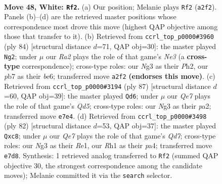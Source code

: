 \documentclass[11pt]{article}
\begin{document}
\clearpage

\begin{figure}[p]\centering
\begin{subfigure}{0.46\textwidth}\centering
\resizebox{\linewidth}{!}{%
\newchessgame
\chessboard[
  setfen={5nk1/1p2Q2p/8/2r4p/8/1q4N1/R5K1/7R w - - 8 48},
  showmover=false,
  pgfstyle=straightmove, color=movearrow, markmove={a2-f2}
]}
\caption{}
\end{subfigure}\hfill
\begin{subfigure}{0.46\textwidth}\centering
\resizebox{\linewidth}{!}{%
\newchessgame
\chessboard[
  setfen={8/4p3/4b1kp/2Q5/1n2q1p1/4N3/7P/5RK1 w - - 3 43},
  showmover=false,
  pgfstyle=straightmove, color=movearrow, markmove={e3-g2}
]}
\caption{}
\end{subfigure}
\\[4pt]
\begin{subfigure}{0.46\textwidth}\centering
\resizebox{\linewidth}{!}{%
\newchessgame
\chessboard[
  setfen={5k2/1p6/5r2/6Q1/3q2P1/3N1P2/P3r1P1/2R4K b - - 16 44},
  showmover=false,
  pgfstyle=straightmove, color=movearrow, markmove={d4-d6}
]}
\caption{}
\end{subfigure}\hfill
\begin{subfigure}{0.46\textwidth}\centering
\resizebox{\linewidth}{!}{%
\newchessgame
\chessboard[
  setfen={2r5/1p1Q3n/2pp2pk/8/p1P5/5q2/8/3RR1K1 w - - 0 42},
  showmover=false,
  pgfstyle=straightmove, color=movearrow, markmove={d7-c8}
]}
\caption{}
\end{subfigure}
\caption{\textbf{Move 48, White: \texttt{Rf2}.} (a) Our position; Melanie plays \texttt{Rf2} (\texttt{a2f2}). Panels (b)--(d) are the retrieved master positions whose correspondence most drove this move (highest QAP objective among those that transfer to it). (b) Retrieved from \texttt{ccrl\_top\_p0000\#3960} (ply 84) [structural distance $d$=71, QAP obj=30]: the master played \texttt{Ng2}; under $\mu$ our \emph{Ra2} plays the role of that game's \emph{Ne3} (a \textbf{cross-type} correspondence); cross-type roles: our \emph{N}g3 as their \emph{P}h2, our \emph{p}b7 as their \emph{b}e6; transferred move \texttt{a2f2} \textbf{(endorses this move)}. (c) Retrieved from \texttt{ccrl\_top\_p0000\#3194} (ply 87) [structural distance $d$=60, QAP obj=39]: the master played \texttt{Qd6}; under $\mu$ our \emph{Qe7} plays the role of that game's \emph{Qd5}; cross-type roles: our \emph{N}g3 as their \emph{p}a2; transferred move \texttt{e7e4}. (d) Retrieved from \texttt{ccrl\_top\_p0000\#3498} (ply 82) [structural distance $d$=53, QAP obj=37]: the master played \texttt{Qxc8}; under $\mu$ our \emph{Qe7} plays the role of that game's \emph{Qd7}; cross-type roles: our \emph{N}g3 as their \emph{R}e1, our \emph{R}h1 as their \emph{p}a4; transferred move \texttt{e7d8}. Synthesis: 1 retrieved analog transferred to \texttt{Rf2} (summed QAP objective 30, the strongest correspondence among the candidate moves); Melanie committed it via the \texttt{search} selector.}
\label{fig:thought-m94}
\end{figure}
\end{document}
